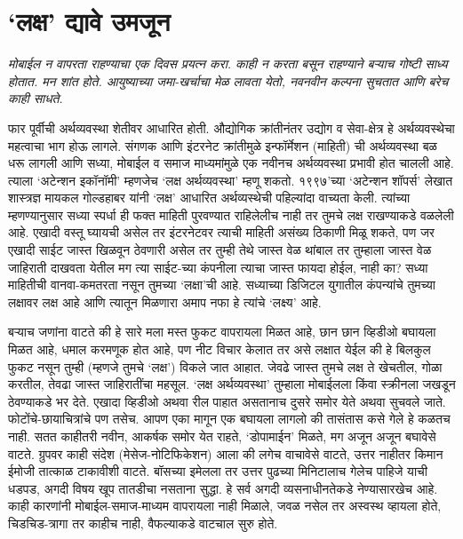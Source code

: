 \chapter{`लक्ष' द्यावे उमजून}

{\textit{मोबाईल न वापरता राहण्याचा एक दिवस प्रयत्न करा. काही न करता बसून राहण्याने बऱ्याच गोष्टी साध्य होतात. मन शांत होते. आयुष्याच्या जमा-खर्चाचा मेळ लावता येतो, नवनवीन कल्पना सुचतात आणि बरेच काही साधते.}}

\vspace{1.5em}

फार पूर्वीची अर्थव्यवस्था शेतीवर आधारित होती. औद्योगिक क्रांतीनंतर उद्योग व सेवा-क्षेत्र हे अर्थव्यवस्थेचा महत्वाचा भाग होऊ लागले. संगणक आणि इंटरनेट क्रांतीमुळे इन्फॉर्मेशन (माहिती) ची अर्थव्यवस्था बळ धरू लागली आणि सध्या, मोबाईल व समाज माध्यमांमुळे एक नवीनच अर्थव्यवस्था प्रभावी होत चालली आहे. त्याला `अटेन्शन इकॉनॉमी' म्हणजेच `लक्ष अर्थव्यवस्था' म्हणू शकतो. १९९७'च्या `अटेन्शन शॉपर्स' लेखात शास्त्रज्ञ मायकल गोल्डहाबर यांनी `लक्ष' आधारित अर्थव्यस्थेची पहिल्यांदा वाच्यता केली. त्यांच्या म्हणण्यानुसार सध्या स्पर्धा ही फक्त माहिती पुरवण्यात राहिलेलीच नाही तर तुमचे लक्ष राखण्याकडे वळलेली आहे. एखादी वस्तू घ्यायची असेल तर इंटरनेटवर त्याची माहिती असंख्य ठिकाणी मिळू शकते, पण जर एखादी साईट जास्त खिळवून ठेवणारी असेल तर तुम्ही तेथे जास्त वेळ थांबाल तर तुम्हाला जास्त वेळ जाहिराती दाखवता येतील मग त्या साईट-च्या कंपनीला त्याचा जास्त फायदा होईल, नाही का? सध्या माहितीची वानवा-कमतरता नसून तुमच्या `लक्षा'ची आहे. सध्याच्या डिजिटल युगातील कंपन्यांचे तुमच्या लक्षावर लक्ष आहे आणि त्यातून मिळणारा अमाप नफा हे त्यांचे `लक्ष्य' आहे.

बऱ्याच जणांना वाटते की हे सारे मला मस्त फुकट वापरायला मिळत आहे, छान छान व्हिडीओ बघायला मिळत आहे, धमाल करमणूक होत आहे, पण नीट विचार केलात तर असे लक्षात येईल की हे बिलकुल फुकट नसून तुम्ही (म्हणजे तुमचे `लक्ष') विकले जात आहात. जेवढे जास्त तुमचे लक्ष ते खेचतील, गोळा करतील, तेवढा जास्त जाहिरातींचा महसूल. `लक्ष अर्थव्यवस्था' तुम्हाला मोबाईलला किंवा स्क्रीनला जखडून ठेवण्याकडे भर देते. एखादा व्हिडीओ अथवा रील पाहात असतानाच दुसरे समोर येते अथवा सुचवले जाते. फोटोंचे-छायाचित्रांचे पण तसेच. आपण एका मागून एक बघायला लागलो की तासंतास कसे गेले हे कळतच नाही. सतत काहीतरी नवीन, आकर्षक समोर येत राहते, `डोपामाईन' मिळते, मग अजून अजून बघावेसे वाटते. ग्रुपवर काही संदेश (मेसेज-नोटिफिकेशन) आला की लगेच वाचावेसे वाटते, उत्तर नाहीतर किमान ईमोजी तात्काळ टाकावीशी वाटते. बॉसच्या इमेलला तर उत्तर पुढच्या मिनिटालाच गेलेच पाहिजे याची धडपड, अगदी विषय खूप तातडीचा नसताना सुद्धा. हे सर्व अगदी व्यसनाधीनतेकडे नेण्यासारखेच आहे. काही कारणांनी मोबाईल-समाज-माध्यम वापरायला नाही मिळाले, जवळ नसेल तर अस्वस्थ व्हायला होते, चिडचिड-त्रागा तर काहीच नाही, वैफल्याकडे वाटचाल सुरु होते.

